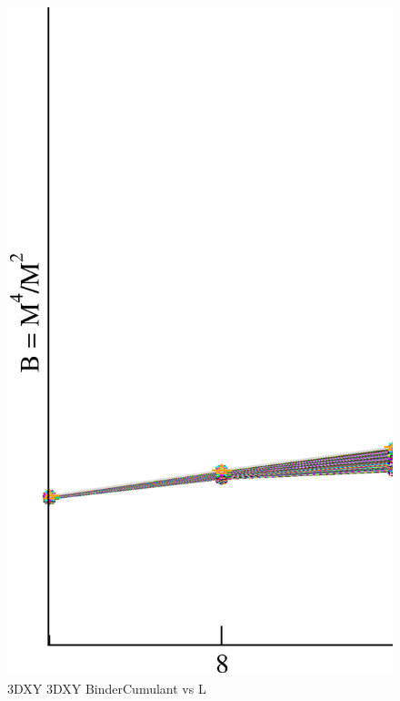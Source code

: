 \begin{figure}[!htpb]
  \centering
  \includegraphics[width=\textwidth]{./plots/3DXY/3DXY_BinderCumulant_vs_L.eps}
  \caption{3DXY 3DXY BinderCumulant vs L}
\end{figure}

